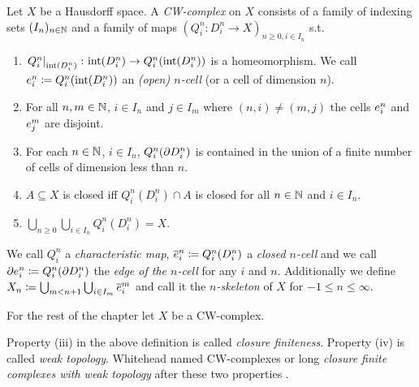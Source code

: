 \begin{defi}\label{defi:CWComplex2}
    Let $X$ be a Hausdorff space. 
    A \emph{CW-complex} on $X$ consists of a family of indexing sets $(I_n)_{n \in \bN}$ and a family of maps $(Q_i^n\colon D_i^n\rightarrow X)_{n \ge 0, i \in I_n}$ s.t.
    \begin{enumerate}
        \item $\restrict{Q_i^n}{\interior{D_i^n}}\colon \interior{D_i^n} \rightarrow Q_i^n(\interior{D_i^n})$ is a homeomorphism. We call $\ocell{n}{i} \coloneq Q_i^n(\interior{D_i^n})$ an \emph{(open) $n$-cell} (or a cell of dimension $n$).
        \item For all $n, m \in \bN$, $i \in I_n$ and $j \in I_m$ where $(n, i) \ne (m, j)$ the cells $\ocell{n}{i}$ and $\ocell{m}{j}$ are disjoint.
        \item For each $n \in \bN$, $i \in I_n$, $Q_i^n(\boundary D_i^n)$ is contained in the union of a finite number of cells of dimension less than $n$.
        \item $A \subseteq X$ is closed iff $Q_i^n(D_i^n) \cap A$ is closed for all $n \in \bN$ and $i \in I_n$.
        \item $\bigcup_{n \ge 0}\bigcup_{i \in I_n} Q_i^n(D_i^n) = X$.
    \end{enumerate}
    We call $Q_i^n$ a \emph{characteristic map}, $\ccell{n}{i} \coloneq Q_i^n(D_i^n)$ a \emph{closed $n$-cell} and we call $\ecell{n}{i} \coloneq Q_i^n(\boundary D_i^n)$ the \emph{edge of the $n$-cell} for any $i$ and $n$.
    Additionally we define $X_n \coloneq \bigcup_{m < n + 1} \bigcup_{i \in I_m} \ccell{m}{i}$ and call it the \emph{$n$-skeleton} of $X$ for $-1 \le n \le \infty$.
\end{defi}


For the rest of the chapter let $X$ be a CW-complex.

\begin{rem}
    Property (iii) in the above definition is called \emph{closure finiteness}. 
    Property (iv) is called \emph{weak topology}.
    Whitehead named CW-complexes or long \emph{closure finite complexes with weak topology} after these two properties \cite{Whitehead2018}.
\end{rem}

